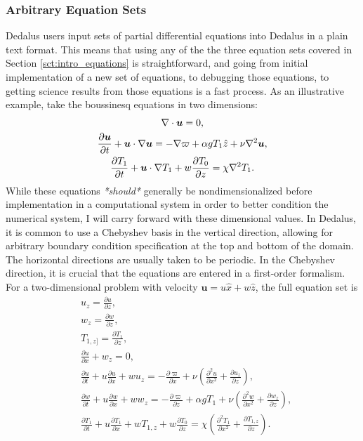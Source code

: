 \subsubsection{Arbitrary Equation Sets}
Dedalus users input sets of partial differential equations into Dedalus in a plain text format.
This means that using any of the the three equation sets covered in Section \ref{sct:intro_equations} is straightforward, and going from initial implementation of a new set of equations, to debugging those equations, to getting science results from those equations is a fast process.
As an illustrative example, take the boussinesq equations in two dimensions:
\begin{gather}
\nabla\cdot\bm{u} = 0, \\
\frac{\partial \bm{u}}{\partial t} + \bm{u}\cdot\nabla \bm{u} = -\nabla\varpi + \alpha g T_1 \hat{z} + \nu \nabla^2\bm{u}, \\
\frac{\partial T_1}{\partial t} + \bm{u}\cdot\nabla T_1 + w\frac{\partial T_0}{\partial z} = \chi \nabla^2 T_1.
\end{gather}
While these equations \emph{*should*} generally be nondimensionalized before implementation in a computational system in order to better condition the numerical system, I will carry forward with these dimensional values.
In Dedalus, it is common to use a Chebyshev basis in the vertical direction, allowing for arbitrary boundary condition specification at the top and bottom of the domain.
The horizontal directions are usually taken to be periodic.
In the Chebyshev direction, it is crucial that the equations are entered in a first-order formalism.
For a two-dimensional problem with velocity $\bm{u} = u\hat{x} + w\hat{z}$, the full equation set is
\begin{align}
&u_z = \frac{\partial u}{\partial z}, \label{eqn:dedalus1} \\
&w_z = \frac{\partial w}{\partial z}, \\
&T_{1,z]} = \frac{\partial T_1}{\partial z}, \\
&\frac{\partial u}{\partial x} + w_z = 0, \\
&\frac{\partial u}{\partial t} + u\frac{\partial u}{\partial x} + w u_z = -\frac{\partial \varpi}{\partial x} + \nu \left(\frac{\partial^2 u}{\partial x^2} + \frac{\partial u_z}{\partial z}\right),\\
&\frac{\partial w}{\partial t} + u\frac{\partial w}{\partial x} + w w_z = -\frac{\partial \varpi}{\partial z} + \alpha g T_1 + \nu \left(\frac{\partial^2 w}{\partial x^2} + \frac{\partial w_z}{\partial z}\right),\\
&\frac{\partial T_1}{\partial t} + u\frac{\partial T_1}{\partial x} + w T_{1,z}  + w \frac{\partial T_0}{\partial z} = \chi \left(\frac{\partial^2 T_1}{\partial x^2} + \frac{\partial T_{1,z}}{\partial z}\right) \label{eqn:dedalus7}.
\end{align}
